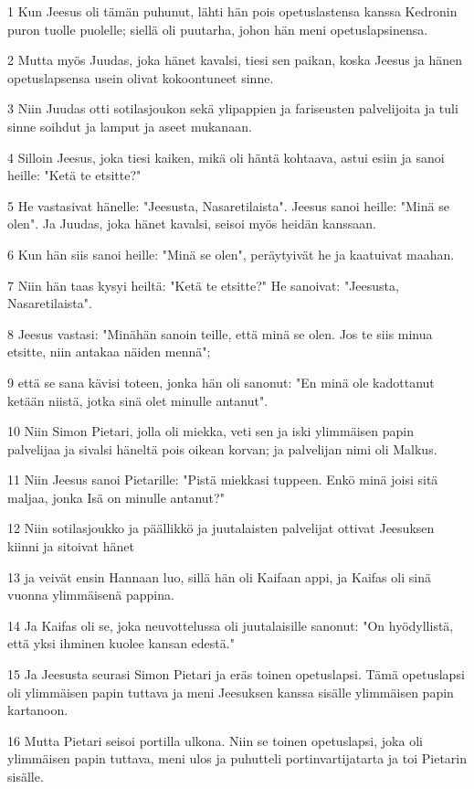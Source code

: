 \par 1 Kun Jeesus oli tämän puhunut, lähti hän pois opetuslastensa kanssa Kedronin puron tuolle puolelle; siellä oli puutarha, johon hän meni opetuslapsinensa.
\par 2 Mutta myös Juudas, joka hänet kavalsi, tiesi sen paikan, koska Jeesus ja hänen opetuslapsensa usein olivat kokoontuneet sinne.
\par 3 Niin Juudas otti sotilasjoukon sekä ylipappien ja fariseusten palvelijoita ja tuli sinne soihdut ja lamput ja aseet mukanaan.
\par 4 Silloin Jeesus, joka tiesi kaiken, mikä oli häntä kohtaava, astui esiin ja sanoi heille: "Ketä te etsitte?"
\par 5 He vastasivat hänelle: "Jeesusta, Nasaretilaista". Jeesus sanoi heille: "Minä se olen". Ja Juudas, joka hänet kavalsi, seisoi myös heidän kanssaan.
\par 6 Kun hän siis sanoi heille: "Minä se olen", peräytyivät he ja kaatuivat maahan.
\par 7 Niin hän taas kysyi heiltä: "Ketä te etsitte?" He sanoivat: "Jeesusta, Nasaretilaista".
\par 8 Jeesus vastasi: "Minähän sanoin teille, että minä se olen. Jos te siis minua etsitte, niin antakaa näiden mennä";
\par 9 että se sana kävisi toteen, jonka hän oli sanonut: "En minä ole kadottanut ketään niistä, jotka sinä olet minulle antanut".
\par 10 Niin Simon Pietari, jolla oli miekka, veti sen ja iski ylimmäisen papin palvelijaa ja sivalsi häneltä pois oikean korvan; ja palvelijan nimi oli Malkus.
\par 11 Niin Jeesus sanoi Pietarille: "Pistä miekkasi tuppeen. Enkö minä joisi sitä maljaa, jonka Isä on minulle antanut?"
\par 12 Niin sotilasjoukko ja päällikkö ja juutalaisten palvelijat ottivat Jeesuksen kiinni ja sitoivat hänet
\par 13 ja veivät ensin Hannaan luo, sillä hän oli Kaifaan appi, ja Kaifas oli sinä vuonna ylimmäisenä pappina.
\par 14 Ja Kaifas oli se, joka neuvottelussa oli juutalaisille sanonut: "On hyödyllistä, että yksi ihminen kuolee kansan edestä."
\par 15 Ja Jeesusta seurasi Simon Pietari ja eräs toinen opetuslapsi. Tämä opetuslapsi oli ylimmäisen papin tuttava ja meni Jeesuksen kanssa sisälle ylimmäisen papin kartanoon.
\par 16 Mutta Pietari seisoi portilla ulkona. Niin se toinen opetuslapsi, joka oli ylimmäisen papin tuttava, meni ulos ja puhutteli portinvartijatarta ja toi Pietarin sisälle.
